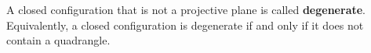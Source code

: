 A closed configuration that is not a projective plane is called \textbf{degenerate}. Equivalently, a closed configuration is degenerate if and only if it does not contain a quadrangle.
